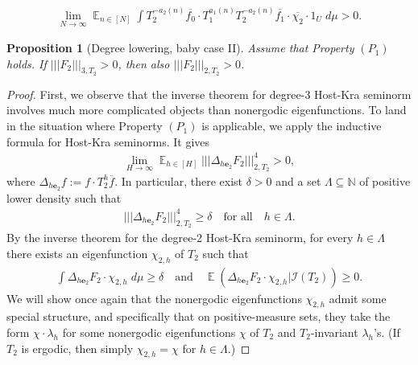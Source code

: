 \documentclass[10pt,a4paper]{amsart}
\newtheorem{proposition}{Proposition}
\newcommand{\CI}{{\mathcal I}}
\DeclareMathOperator*{\E}{\mathbb{E}}
\newcommand{\N}{{\mathbb N}}
\newcommand{\be}{{\mathbf{e}}}
\newcommand{\nnorm}[1]{\lvert\!|\!| #1|\!|\!\rvert}
\begin{document}
    \begin{align}\label{E: expanding dual}
        \lim_{N\to\infty}\E_{n\in[N]}\int T_2^{-a_2(n)}\overline{f_0}\cdot T_1^{a_1(n)}T_2^{-a_2(n)}\overline{f_1}\cdot \overline{\chi_2}\cdot 1_U\; d\mu > 0.
    \end{align}

\begin{proposition}[Degree lowering, baby case II]\label{P: degree lowering s=3}
    Assume %
    that Property $(P_1)$ holds. If $\nnorm{F_2}_{3, T_2}>0$, then also $\nnorm{F_2}_{2, T_2}>0$. 
\end{proposition}

\begin{proof}
    First, we observe that the inverse theorem for degree-3 Host-Kra seminorm involves much more complicated objects than nonergodic eigenfunctions. To land in the situation where Property $(P_1)$ is applicable, we apply the inductive formula for Host-Kra seminorms. It gives
    \begin{align*}
        \lim_{H\to\infty}\E_{h\in[H]}\nnorm{\Delta_{h\be_2} F_2}_{2, T_2}^4 >0,
    \end{align*}
    where $\Delta_{h\be_2}f:=f\cdot T_2^h\overline{f}$.
    In particular, there exist $\delta>0$ and  a set $\Lambda\subseteq \N$ of positive lower density such that 
    \begin{align}\label{E: lower bound on Lambda}
        \nnorm{\Delta_{h\be_2} F_2}_{2, T_2}^4 \geq \delta \quad \textrm{for all}\quad h\in \Lambda.
    \end{align}
    By the inverse theorem for the degree-2 Host-Kra seminorm, for every $h\in\Lambda$ there exists an eigenfunction $\chi_{2,h}$ of $T_2$ such that 
    \begin{align*}%
        \int \Delta_{h\be_2} F_2 \cdot {\chi_{2,h}}\; d\mu \geq \delta\quad \textrm{and} \quad \E(\Delta_{h\be_2} F_2\cdot {\chi_{2,h}}|\CI(T_2))\geq 0.
    \end{align*}
    We will show once again that the nonergodic eigenfunctions $\chi_{2,h}$ admit some special structure, and specifically that on positive-measure sets, they take the form $\chi\cdot \lambda_h$ for some nonergodic eigenfunctions $\chi$ of $T_2$ and $T_2$-invariant $\lambda_h$'s. (If $T_2$ is ergodic, then simply $\chi_{2,h} = \chi$ for $h\in\Lambda$.)
    

\end{proof}
\end{document}
